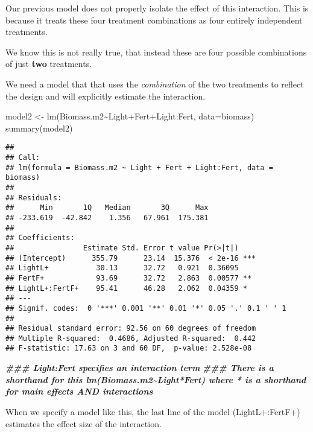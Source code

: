 \documentclass[
]{article}
\newenvironment{Shaded}{\begin{snugshade}}{\end{snugshade}}
\newcommand{\AttributeTok}[1]{\textcolor[rgb]{0.77,0.63,0.00}{#1}}
\newcommand{\DocumentationTok}[1]{\textcolor[rgb]{0.56,0.35,0.01}{\textbf{\textit{#1}}}}
\newcommand{\FunctionTok}[1]{\textcolor[rgb]{0.00,0.00,0.00}{#1}}
\newcommand{\NormalTok}[1]{#1}
\newcommand{\OtherTok}[1]{\textcolor[rgb]{0.56,0.35,0.01}{#1}}
\newcommand{\SpecialCharTok}[1]{\textcolor[rgb]{0.00,0.00,0.00}{#1}}
\begin{document}
Our previous model does not properly isolate the effect of this
interaction. This is because it treats these four treatment combinations
as four entirely independent treatments.

We know this is not really true, that instead these are four possible
combinations of just \textbf{two} treatments.

We need a model that that uses the \emph{combination} of the two
treatments to reflect the design and will explicitly estimate the
interaction.

\begin{Shaded}
\begin{Highlighting}[]
\NormalTok{model2 }\OtherTok{\textless{}{-}} \FunctionTok{lm}\NormalTok{(Biomass.m2}\SpecialCharTok{\textasciitilde{}}\NormalTok{Light}\SpecialCharTok{+}\NormalTok{Fert}\SpecialCharTok{+}\NormalTok{Light}\SpecialCharTok{:}\NormalTok{Fert, }\AttributeTok{data=}\NormalTok{biomass)}
\FunctionTok{summary}\NormalTok{(model2)}
\end{Highlighting}
\end{Shaded}

\begin{verbatim}
## 
## Call:
## lm(formula = Biomass.m2 ~ Light + Fert + Light:Fert, data = biomass)
## 
## Residuals:
##      Min       1Q   Median       3Q      Max 
## -233.619  -42.842    1.356   67.961  175.381 
## 
## Coefficients:
##                Estimate Std. Error t value Pr(>|t|)    
## (Intercept)      355.79      23.14  15.376  < 2e-16 ***
## LightL+           30.13      32.72   0.921  0.36095    
## FertF+            93.69      32.72   2.863  0.00577 ** 
## LightL+:FertF+    95.41      46.28   2.062  0.04359 *  
## ---
## Signif. codes:  0 '***' 0.001 '**' 0.01 '*' 0.05 '.' 0.1 ' ' 1
## 
## Residual standard error: 92.56 on 60 degrees of freedom
## Multiple R-squared:  0.4686, Adjusted R-squared:  0.442 
## F-statistic: 17.63 on 3 and 60 DF,  p-value: 2.528e-08
\end{verbatim}

\begin{Shaded}
\begin{Highlighting}[]
\DocumentationTok{\#\#\# Light:Fert specifies an interaction term}
\DocumentationTok{\#\#\# There is a shorthand for this lm(Biomass.m2\textasciitilde{}Light*Fert) where * is a shorthand for main effects AND interactions}
\end{Highlighting}
\end{Shaded}

When we specify a model like this, the last line of the model
(LightL+:FertF+) estimates the effect size of the interaction.
\end{document}
